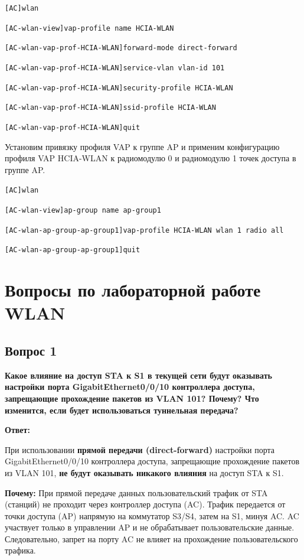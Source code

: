 \texttt{[AC]wlan}

\texttt{[AC-wlan-view]vap-profile name HCIA-WLAN}

\texttt{[AC-wlan-vap-prof-HCIA-WLAN]forward-mode direct-forward}

\texttt{[AC-wlan-vap-prof-HCIA-WLAN]service-vlan vlan-id 101}

\texttt{[AC-wlan-vap-prof-HCIA-WLAN]security-profile HCIA-WLAN}

\texttt{[AC-wlan-vap-prof-HCIA-WLAN]ssid-profile HCIA-WLAN}

\texttt{[AC-wlan-vap-prof-HCIA-WLAN]quit}

Установим привязку профиля VAP к группе AP и применим конфигурацию профиля VAP HCIA-WLAN к радиомодулю 0 и радиомодулю 1 точек доступа в группе AP.

\texttt{[AC]wlan}

\texttt{[AC-wlan-view]ap-group name ap-group1}

\texttt{[AC-wlan-ap-group-ap-group1]vap-profile HCIA-WLAN wlan 1 radio all}

\texttt{[AC-wlan-ap-group-ap-group1]quit}

\section*{Вопросы по лабораторной работе WLAN}

\subsection*{Вопрос 1}
\textbf{Какое влияние на доступ STA к S1 в текущей сети будут оказывать настройки порта GigabitEthernet0/0/10 контроллера доступа, запрещающие прохождение пакетов из VLAN 101? Почему? Что изменится, если будет использоваться туннельная передача?}

\textbf{Ответ:}

При использовании \textbf{прямой передачи (direct-forward)} настройки порта GigabitEthernet0/0/10 контроллера доступа, запрещающие прохождение пакетов из VLAN 101, \textbf{не будут оказывать никакого влияния} на доступ STA к S1.

\textbf{Почему:} 
При прямой передаче данных пользовательский трафик от STA (станций) не проходит через контроллер доступа (AC). Трафик передается от точки доступа (AP) напрямую на коммутатор S3/S4, затем на S1, минуя AC. AC участвует только в управлении AP и не обрабатывает пользовательские данные. Следовательно, запрет на порту AC не влияет на прохождение пользовательского трафика.

